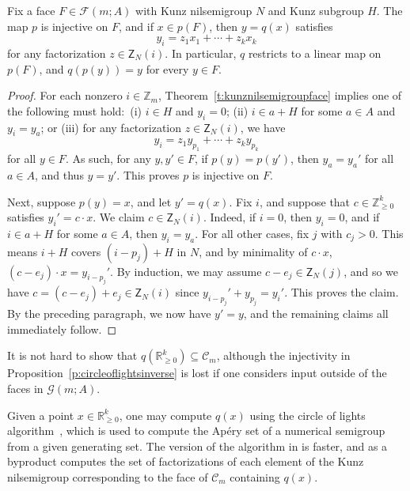 \documentclass[ALCO, Unicode]{cedram}
\newcommand\ZZ{\mathbb{Z}}
\newcommand\RR{\mathbb{R}}
\newcommand\cC{{\mathcal C}}
\begin{document}
\begin{prop}\label{p:circleoflightsinverse}
Fix a face $F \in \mathcal F(m; A)$ with Kunz nilsemigroup $N$ and Kunz subgroup $H$.  The map $p$ is injective on $F$, and if $x \in p(F)$, then $y = q(x)$ satisfies
$$y_i = z_1 x_1 + \cdots + z_k x_k$$
for any factorization $z \in \mathsf Z_N(i)$.  In particular, $q$ restricts to a linear map on $p(F)$, and $q(p(y)) = y$ for every $y \in F$.  
\end{prop}

\begin{proof}
For each nonzero $i \in \ZZ_m$, Theorem~\ref{t:kunznilsemigroupface} implies one of the following must hold:\ (i) $i \in H$ and $y_i = 0$; (ii) $i \in a + H$ for some $a \in A$ and $y_i = y_a$; or (iii) for any factorization $z \in \mathsf Z_N(i)$, we have 
$$y_i = z_1 y_{p_1} + \cdots + z_k y_{p_k}$$
for all $y \in F$.  As such, for any $y, y' \in F$, if $p(y) = p(y')$, then $y_a = y_a'$ for all $a \in A$, and thus $y = y'$.  This proves $p$ is injective on $F$.  

Next, suppose $p(y) = x$, and let $y' = q(x)$.  Fix $i$, and suppose that $c \in \ZZ_{\ge 0}^k$ satisfies $y_i' = c \cdot x$.  We claim $c \in \mathsf Z_N(i)$.  Indeed, if $i = 0$, then $y_i = 0$, and if $i \in a + H$ for some $a \in A$, then $y_i = y_a$.  For all other cases, fix $j$ with $c_j > 0$.  This means $i + H$ covers $(i - p_j) + H$ in $N$, and by minimality of $c \cdot x$, $(c - e_j) \cdot x = y_{i - p_j}'$.  By induction, we may assume $c - e_j \in \mathsf Z_N(j)$, and so we have $c = (c - e_j) + e_j \in \mathsf Z_N(i)$ since $y_{i - p_j}' + y_{p_j} = y_i'$.  This proves the claim.  By the preceding paragraph, we now have $y' = y$, and the remaining claims all immediately follow.  
\end{proof}

It is not hard to show that $q(\RR_{\ge 0}^k) \subseteq \cC_m$, although the injectivity in Proposition~\ref{p:circleoflightsinverse} is lost if one considers input outside of the faces in $\mathcal G(m;A)$.  

\begin{remas}\label{r:circleoflightsinverse}
Given a point $x \in \RR_{\ge 0}^k$, one may compute $q(x)$ using the circle of lights algorithm~\cite{wilfconjecture}, which is used to compute the Ap\'ery set of a numerical semigroup from a given generating set.  The version of the algorithm in \cite[Algorithm~7.1]{kunzfaces1} is faster, and as a byproduct computes the set of factorizations of each element of the Kunz nilsemigroup corresponding to the face of $\cC_m$ containing $q(x)$.  
\end{remas}
\end{document}
